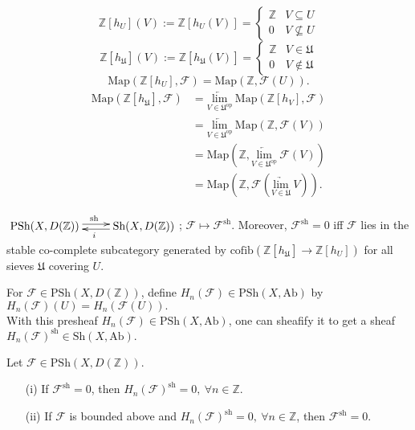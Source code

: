 \documentclass[UTF8,12,a4paper]{ctexart}
\theoremstyle{definition}
\begin{document}
\rem 
$$
\mathbb{Z}[h_U](V):=\mathbb{Z}[h_U(V)]=
\begin{cases}
\mathbb{Z}& V\subseteq U\\
0& V\nsubseteq U
\end{cases}
$$
$$
\mathbb{Z}[h_\mathfrak{U}](V):=\mathbb{Z}[h_\mathfrak{U}(V)]=
\begin{cases}
\mathbb{Z}& V\in \mathfrak{U}\\
0& V\notin \mathfrak{U}
\end{cases}
$$
$$
\text{Map}(\mathbb{Z}[h_U],\mathcal{F})=\text{Map}(\mathbb{Z},\mathcal{F}(U)).
$$
\begin{align*}
\text{Map}(\mathbb{Z}[h_\mathfrak{U}],\mathcal{F})
&=\underset{V\in\mathfrak{U}^\text{op}}{\underleftarrow{\text{lim}}}\ \text{Map}(\mathbb{Z}[h_V],\mathcal{F})\\
&=\underset{V\in\mathfrak{U}^\text{op}}{\underleftarrow{\text{lim}}}\ \text{Map}(\mathbb{Z},\mathcal{F}(V))\\
&=\text{Map}(\mathbb{Z},\underset{V\in\mathfrak{U}^\text{op}}{\underleftarrow{\text{lim}}}\ \mathcal{F}(V))\\
&=\text{Map}(\mathbb{Z},	\mathcal{F}(\underset{V\in\mathfrak{U}}{\underrightarrow{\text{lim}}}\ V)).
\end{align*}

\prop 
$\xymatrix
{\text{PSh}(X,D(\mathbb{Z}))\ar@<0.5ex>[r]^{\text{sh}}&
\text{Sh}(X,D(\mathbb{Z}))\ar@<0.5ex>[l]^{i}
}
$; $\mathcal{F}\mapsto \mathcal{F}^\text{sh}$. Moreover, $\mathcal{F}^\text{sh}=0$ iff $\mathcal{F}$ lies in the stable co-complete subcategory generated by $\text{cofib}(\mathbb{Z}[h_\mathfrak{U}]\to \mathbb{Z}[h_U])$ for all sieves $\mathfrak{U}$ covering $U$.

\dfn 
For $\mathcal{F}\in\text{PSh}(X,D(\mathbb{Z}))$, define $H_n(\mathcal{F})\in \text{PSh}(X,\text{Ab})$ by $H_n(\mathcal{F})(U)=H_n(\mathcal{F}(U)).$
\\
With this presheaf $H_n(\mathcal{F})\in\text{PSh}(X,\text{Ab})$, one can sheafify it to get a sheaf $H_n(\mathcal{F})^\text{sh}\in\text{Sh}(X,\text{Ab}).$

\prop 
Let $\mathcal{F}\in \text{PSh}(X,D(\mathbb{Z})).$
\begin{itemize}
	\item [(i)] If $\mathcal{F}^\text{sh}=0$, then $H_n(\mathcal{F})^\text{sh}=0,\ \forall n\in\mathbb{Z}.$
	\item [(ii)] If $\mathcal{F}$ is bounded above and $H_n(\mathcal{F})^\text{sh}=0,\ \forall n\in\mathbb{Z}$, then $\mathcal{F}^\text{sh}=0$.
\end{itemize}
\end{document}

